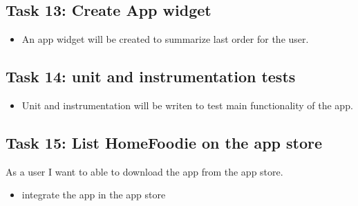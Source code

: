 \documentclass{article}
\begin{document}
\subsection{Task 13: Create App widget}
  \begin{itemize}
    \item An app widget will be created to summarize last order for the user.
  \end{itemize}

\subsection{Task 14: unit and instrumentation tests}
  \begin{itemize} 
    \item Unit and instrumentation will be writen to test main functionality of the app.
  \end{itemize}


\subsection{Task 15: List HomeFoodie on the app store}
	As a user I want to able to download the app from the app store.
  \begin{itemize}
    \item	integrate the app in the app store
  \end{itemize}
\end{document}
